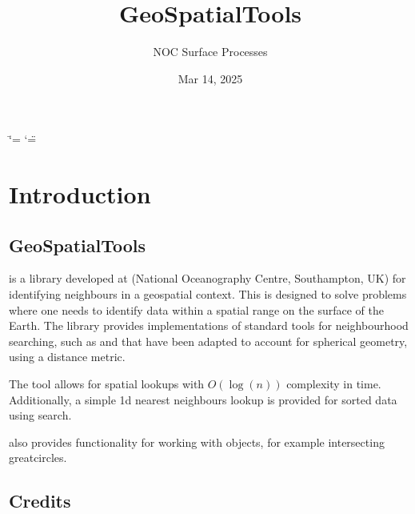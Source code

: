 \documentclass[letterpaper,10pt,english]{sphinxmanual}
\title{GeoSpatialTools}
\date{Mar 14, 2025}
\author{NOC Surface Processes}
\begin{document}
\ifdefined\shorthandoff
  \ifnum\catcode`\=\string=\active\shorthandoff{=}\fi
  \ifnum\catcode`\"=\active{}\fi
\fi

\pagestyle{empty}
\sphinxmaketitle
\pagestyle{plain}
\sphinxtableofcontents
\pagestyle{normal}
\label{\detokenize{index::doc}}


\sphinxstepscope


\chapter{Introduction}
\label{\detokenize{introduction:introduction}}\label{\detokenize{introduction::doc}}

\section{GeoSpatialTools}
\label{\detokenize{introduction:geospatialtools}}
\sphinxAtStartPar
{} is a  library developed at  (National Oceanography Centre, Southampton, UK) for
identifying neighbours in a geo\sphinxhyphen{}spatial context. This is designed to solve problems where one needs to identify
data within a spatial range on the surface of the Earth. The library provides implementations of standard tools
for neighbourhood searching, such as  and  that have been adapted to account for spherical
geometry, using a  distance metric.

\sphinxAtStartPar
The tool allows for spatial look\sphinxhyphen{}ups with \(O(\log(n))\) complexity in time. Additionally, a simple 1\sphinxhyphen{}d nearest
neighbours look\sphinxhyphen{}up is provided for sorted data using  search.

\sphinxAtStartPar
{} also provides functionality for working with  objects, for example intersecting
great\sphinxhyphen{}circles.


\section{Credits}
\label{\detokenize{introduction:credits}}
\end{document}
